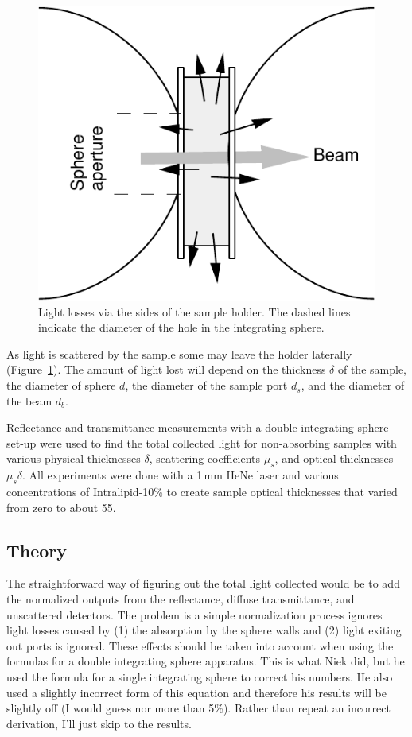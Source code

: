 \documentclass{article}
\begin{document}
\begin{figure}[!b]
\begin{center}
\includegraphics[scale=0.7]{lightloss.pdf}
\end{center}
\caption{Light losses via the sides of the sample holder.  The dashed lines
indicate the diameter of the hole in the integrating sphere.}  
\label{lightloss}
\end{figure}

\noindent
As light is scattered by the sample some may leave the holder
laterally (Figure~\ref{lightloss}).  The amount of light lost will
depend on the thickness $\delta$ of the sample, the diameter of sphere $d$,
the diameter of the sample port $d_s$, and the diameter of the beam $d_b$.

Reflectance and transmittance measurements with a double integrating sphere set-up
were used to find the total collected light for non-absorbing samples with
various physical thicknesses $\delta$, scattering coefficients $\mu_s$, and optical
thicknesses $\mu_s \delta$.  All experiments were done with a 1\,mm  HeNe laser
and various concentrations of Intralipid-10\% to create sample optical
thicknesses that varied from zero to about 55. 

\subsection*{Theory}

The straightforward way of figuring out the total light collected would be
to add the normalized outputs from the reflectance, diffuse transmittance,
and unscattered detectors.  The problem is a simple normalization process
ignores light losses caused by (1) the absorption 
by the sphere walls and (2) light exiting out ports is ignored.
These effects should
be taken into account when using the formulas for a double integrating sphere
apparatus.  This is what Niek did, but he used the formula for a single
integrating sphere to correct his numbers.  He also used a slightly
incorrect form of this equation and therefore his results will be
slightly off (I would guess nor more than 5\%).  Rather than repeat
an incorrect derivation, I'll just skip to the results.
\end{document}
